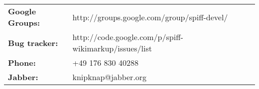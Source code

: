 \begin{tabular}{ll}
{\bf Google Groups:} & http://groups.google.com/group/spiff-devel/ \\
{\bf Bug tracker:}   & http://code.google.com/p/spiff-wikimarkup/issues/list \\
{\bf Phone:}         & +49 176 830 40288 \\
{\bf Jabber:}        & knipknap@jabber.org
\end{tabular}
